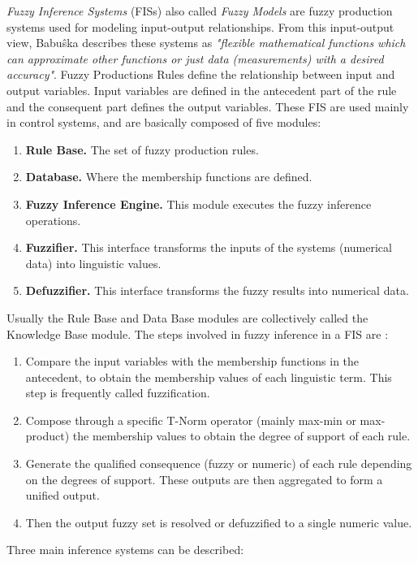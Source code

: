 \textit{Fuzzy Inference Systems} (FISs) also called \textit{Fuzzy
Models} are fuzzy production systems used for modeling input-output
relationships. From this input-output view, Babuŝka
\cite{babuvska1996fuzzy} describes these systems as \textit{"flexible
mathematical functions which can approximate other functions or just
data (measurements) with a desired accuracy"}. Fuzzy Productions Rules
define the relationship between input and output variables. Input
variables are defined in the antecedent part of the rule and the
consequent part defines the output variables. These FIS are used
mainly in control systems, and are basically composed of five
modules\cite{babuvska1996fuzzy}:
\begin{enumerate}  
\item \textbf{Rule Base.} The set of fuzzy production rules.
\item \textbf{Database.} Where the membership functions are defined.
\item \textbf{Fuzzy Inference Engine.} This module executes the 
fuzzy inference operations.
\item \textbf{Fuzzifier.} This interface transforms the inputs 
of the systems (numerical data) into linguistic values.
\item \textbf{Defuzzifier.} This interface transforms the fuzzy 
results into numerical data.
\end{enumerate}
Usually the Rule Base and Data Base modules are collectively 
called the Knowledge Base module. The steps involved in fuzzy 
inference in a FIS are \cite{dubois1980fuzzy}:
\begin{enumerate} 
\item Compare the input variables with the membership functions 
in the antecedent, to obtain the membership values of each 
linguistic term. This step is frequently called fuzzification.
\item Compose through a specific T-Norm operator (mainly max-min 
or max-product) the membership values to obtain the degree of 
support of each rule.
\item Generate the qualified consequence (fuzzy or numeric) of 
each rule depending on the degrees of support. These outputs 
are then aggregated to form a unified output.
\item Then the output fuzzy set is resolved or defuzzified 
to a single numeric value.
\end{enumerate} 
Three main inference systems can be described:
